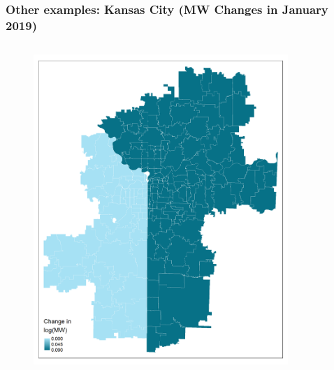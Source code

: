 \documentclass[aspectratio=169, t]{beamer}
\begin{document}
\begin{frame}[label = mw_changes]
\frametitle{Other examples: Kansas City (MW Changes in January 2019)}
    \begin{columns}
        \begin{column}{0.50\textwidth}
            \vspace{-4mm}
            \begin{figure}
                \centering
                \includegraphics[scale = 0.36]{maps_events/output/kc_2018-12_actual_mw.png}
            \end{figure}   
        \end{column}
        \begin{column}{0.50\textwidth}
            \vspace{-4mm}
            \begin{figure}
                \centering

\end{figure}
\end{column}
\end{columns}
\end{frame}
\end{document}
